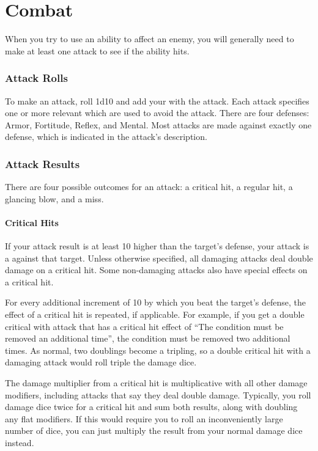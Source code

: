 \chapter{Combat}\label{Combat}

  When you try to use an ability to affect an enemy, you will generally need to make at least one attack to see if the ability hits.

  \subsection{Attack Rolls}\label{Attack Rolls}
    To make an attack, roll 1d10 and add your  with the attack.
    Each attack specifies one or more relevant  which are used to avoid the attack.
    There are four defenses: Armor, Fortitude, Reflex, and Mental.
    Most attacks are made against exactly one defense, which is indicated in the attack's description.

  \subsection{Attack Results}
    There are four possible outcomes for an attack: a critical hit, a regular hit, a glancing blow, and a miss.

    \subsubsection{Critical Hits}\label{Critical Hits}
      If your attack result is at least 10 higher than the target's defense, your attack is a  against that target.
      Unless otherwise specified, all damaging attacks deal double damage on a critical hit.
      Some non-damaging attacks also have special effects on a critical hit.

      For every additional increment of 10 by which you beat the target's defense, the effect of a critical hit is repeated, if applicable.
      For example, if you get a double critical with attack that has a critical hit effect of ``The condition must be removed an additional time'', the condition must be removed two additional times.
      As normal, two doublings become a tripling, so a double critical hit with a damaging attack would roll triple the damage dice.

      The damage multiplier from a critical hit is multiplicative with all other damage modifiers, including attacks that say they deal double damage.
      Typically, you roll damage dice twice for a critical hit and sum both results, along with doubling any flat modifiers.
      If this would require you to roll an inconveniently large number of dice, you can just multiply the result from your normal damage dice instead.


